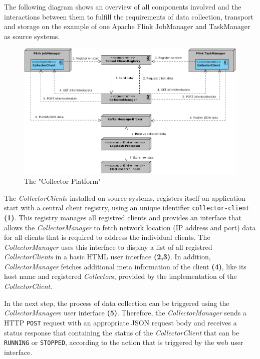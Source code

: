 The following diagram shows an overview of all components involved and the interactions between them to fulfill the
requirements of data collection, transport and storage on the example of one Apache Flink JobManager and TaskManager as
source systems.

\begin{figure}[H]
	\centering
	\includegraphics[width=1.0\textwidth]{../uml/component-diagram.jpg}
	\caption{The "Collector-Platform"}
	\label{fig:collector-platform}
\end{figure}

The \textit{CollectorClient}s installed on source systems, registers itself on application start with a central client registry, using
an unique identifier \verb|collector-client| \textbf{(1)}. This registry manages all registred clients and provides an interface
that allows the \textit{CollectorManager} to fetch network location (IP address and port) data for all clients that is required
to address the individual clients. The \textit{CollectorManager} uses this interface to display a list of all registred
\textit{CollectorClients} in a basic HTML user interface \textbf{(2,3)}. In addition, \textit{CollectorManager} fetches additional
meta information of the client \textbf{(4)}, like its host name and registered \textit{Collector}s, provided by the implementation
of the \textit{CollectorClient}.

In the next step, the process of data collection can be triggered using the \textit{CollectorManager}s user interface \textbf{(5)}.
Therefore, the \textit{CollectorManager} sends a HTTP \verb|POST| request with an appropriate JSON request body and receives a
status response that containing the status of the \textit{CollectorClient} that can be \verb|RUNNING| or \verb|STOPPED|,
according to the action that is triggered by the web user interface.


